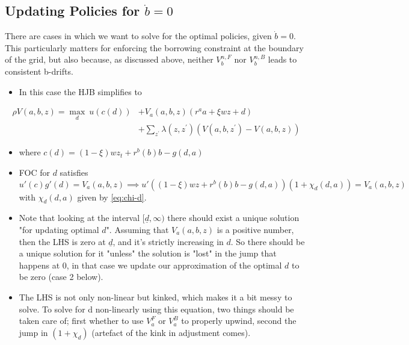 \documentclass[11pt]{article}
\begin{document}
\subsection{Updating Policies for \(\dot{b}=0\)}
\label{sec:orgfcc4ceb}
There are cases in which we want to solve for the optimal policies, given \(\dot{b}=0\). This particularly matters for enforcing the borrowing constraint at the boundary of the grid, but also because, as discussed above, neither \(V_b^{n,F}\) nor \(V_b^{n,B}\) leads to consistent b-drifts. 
\begin{itemize}
\item In this case the HJB simplifies to
\end{itemize}
\begin{align}
\label{eq:hjb-d}
\rho V(a,b,z)=\operatorname*{max}_{d}\ u(c(d))& + V_{a}(a,b,z)(r^{a}a+\xi w z+d) \nonumber \\
&+\sum_{z^{\prime}}\lambda(z,z^{\prime})(V(a,b,z^{\prime})-V(a,b,z))
\end{align}
\begin{itemize}
\item where \(c(d)=(1-\xi)w z_{t}+r^{b}(b)b-g(d,a)\)
\item FOC for \(d\) satisfies \[u'(c)g'(d) = V_a(a,b,z) \implies u'\left((1-\xi)w z+r^{b}(b)b-g(d,a) \right) \left( 1+\chi_{d}(d,a) \right) = V_a(a,b,z)\] with \(\chi_d(d,a)\) given by \eqref{eq:chi-d}.
\item Note that looking at the interval \([\underline{d}, \infty)\) there should exist a unique solution "for updating optimal \(d\)". Assuming that \(V_a(a,b,z)\) is a positive number, then the LHS is zero at \(\underline{d}\), and it's strictly increasing in \(d\). So there should be a unique solution for it "unless" the solution is "lost" in the jump that happens at 0, in that case we update our approximation of the optimal \(d\) to be zero (case 2 below).
\item The LHS is not only non-linear but kinked, which makes it a bit messy to solve. To solve for d non-linearly using this equation, two things should be taken care of; first whether to use \(V_a^F\) or \(V_a^B\) to properly upwind, second the jump in \((1+\chi_d)\) (artefact of the kink in adjustment comes).
\end{itemize}
\end{document}

